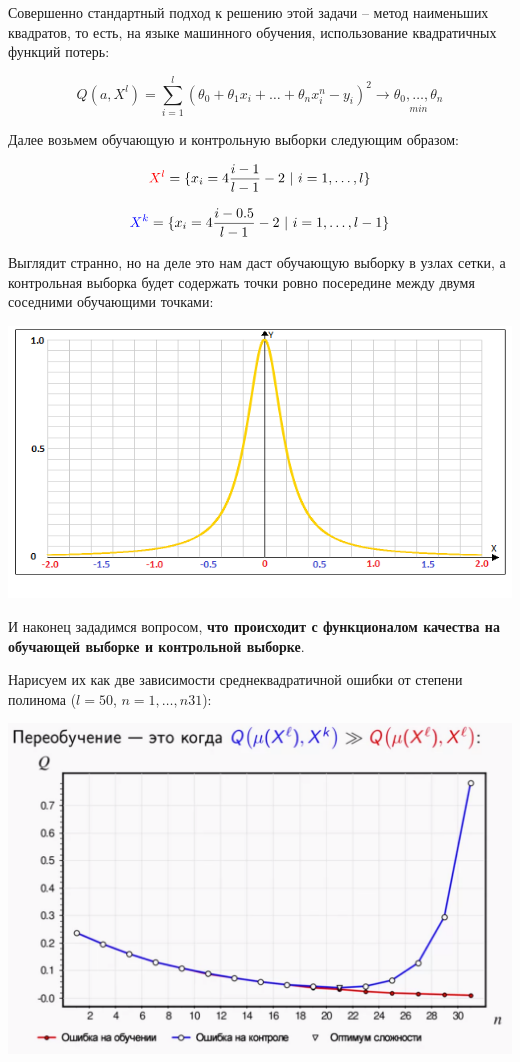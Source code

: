 \documentclass{article}
\begin{document}
Совершенно стандартный подход к решению этой задачи -- метод наименьших квадратов, то есть, на языке машинного обучения, использование квадратичных функций потерь:

$$Q(a, X^l) =
\sum\limits_{i = 1}^l (\theta_0 + \theta_1 x_i + \ldots + \theta_n x_i^n - y_i)^2
\rightarrow \underset{min}{\theta_0,\ldots,\theta_n}$$

Далее возьмем обучающую и контрольную выборки следующим образом:

$$\textcolor{red}{X^l} = \{x_i = 4\frac{i - 1}{l - 1} - 2\ |\ i = 1,\ldots, l\}$$

$$\textcolor{blue}{X^k} = \{x_i = 4\frac{i - 0.5}{l - 1} - 2\ |\ i = 1,\ldots, l - 1\}$$

Выглядит странно, но на деле это нам даст обучающую выборку в узлах сетки, а контрольная выборка будет содержать точки ровно посередине между двумя соседними обучающими точками:

\begin{center}
    \includegraphics[scale=0.8]{2_3.png}
\end{center}

И наконец зададимся вопросом, \textbf{что происходит с функционалом качества на обучающей выборке и контрольной выборке}.

Нарисуем их как две зависимости среднеквадратичной ошибки от степени полинома ($l = 50$, $n = 1,\ldots,n31$):

\begin{center}
    \includegraphics[scale=0.4]{2_4.png}
\end{center}
\end{document}
